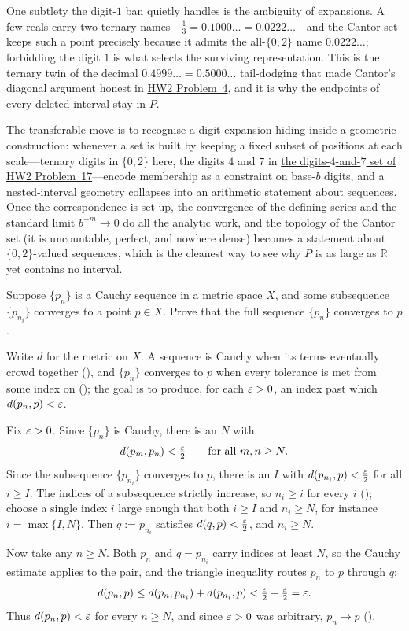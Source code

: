 \documentclass[main.tex]{subfiles}
\begin{document}
\begin{Reflection}
One subtlety the digit-$1$ ban quietly handles is the ambiguity of expansions. A few reals carry two
ternary names---$\tfrac13=0.1000\dots=0.0222\dots$---and the Cantor set keeps such a point precisely
because it admits the all-$\{0,2\}$ name $0.0222\dots$; forbidding the digit $1$ is what selects the
surviving representation. This is the ternary twin of the decimal $0.4999\dots=0.5000\dots$ tail-dodging
that made Cantor's diagonal argument honest in \hyperlink{prob:4}{HW2 Problem~4}, and it is
why the endpoints of every deleted interval stay in $P$.

The transferable move is to recognise a digit expansion hiding inside a geometric construction: whenever
a set is built by keeping a fixed subset of positions at each scale---ternary digits in $\{0,2\}$ here,
the digits $4$ and $7$ in \hyperlink{prob:17}{the digits-$4$-and-$7$ set of HW2 Problem~17}---encode
membership as a constraint on base-$b$ digits, and a nested-interval geometry collapses into an
arithmetic statement
about sequences. Once the correspondence is set up, the convergence of the defining series and the
standard limit $b^{-m}\to 0$ do all the analytic work, and the topology of the Cantor set (it is
uncountable, perfect, and nowhere dense) becomes a statement about $\{0,2\}$-valued sequences, which is
the cleanest way to see why $P$ is as large as $\mathbb R$ yet contains no interval.
\end{Reflection}

Suppose $\{p_{n}\}$ is a Cauchy sequence in a metric space $X$, and some subsequence $\{p_{n_{i}}\}$
converges to a point $p \in X$. Prove that the full sequence $\{p_{n}\}$ converges to $p$.

\begin{Solution}
Write $d$ for the metric on $X$. A sequence is Cauchy when its terms eventually crowd together
(), and $\{p_n\}$ converges to $p$ when every tolerance is met from some index on
(); the goal is to produce, for each $\varepsilon>0$, an index past which $d(p_n,p)<\varepsilon$.

Fix $\varepsilon>0$. Since $\{p_n\}$ is Cauchy, there is an $N$ with
\[
  d(p_m,p_n)<\tfrac{\varepsilon}{2}\qquad\text{for all }m,n\ge N.
\]
Since the subsequence $\{p_{n_i}\}$ converges to $p$, there is an $I$ with $d(p_{n_i},p)<\tfrac{\varepsilon}{2}$
for all $i\ge I$. The indices of a subsequence strictly increase, so $n_i\ge i$ for every $i$
(); choose a single index $i$ large enough that both $i\ge I$ and $n_i\ge N$, for instance
$i=\max\{I,N\}$. Then $q:=p_{n_i}$ satisfies $d(q,p)<\tfrac{\varepsilon}{2}$, and $n_i\ge N$.

Now take any $n\ge N$. Both $p_n$ and $q=p_{n_i}$ carry indices at least $N$, so the Cauchy estimate
applies to the pair, and the triangle inequality routes $p_n$ to $p$ through $q$:
\[
  d(p_n,p)\le d(p_n,p_{n_i})+d(p_{n_i},p)<\tfrac{\varepsilon}{2}+\tfrac{\varepsilon}{2}=\varepsilon.
\]
Thus $d(p_n,p)<\varepsilon$ for every $n\ge N$, and since $\varepsilon>0$ was arbitrary, $p_n\to p$ ().
\end{Solution}
\end{document}
